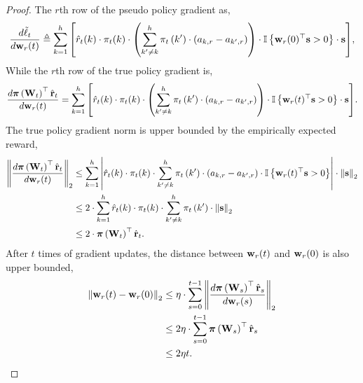 \begin{proof}
The $r$th row of the pseudo policy gradient as,
\begin{equation*}
	\frac{d \tilde{\ell}_t}{d {\mathbf{w}}_r(t)} \triangleq \sum\limits_{k=1}^{h}{ \left[ \hat{r}_{t}(k) \cdot \pi_{t}(k) \cdot \left( \sum\limits_{k^\prime \not= k}^{h}{ \pi_{t}\left(k^\prime\right) \cdot \left( a_{k,r} - a_{k^\prime,r} \right)  } \right) \cdot {\mathbb{I}}\left\{ {\mathbf{w}}_r(0)^\top {\mathbf{s}} > 0 \right\} \cdot {\mathbf{s}} \right] },
\end{equation*}
While the $r$th row of the true policy gradient is,
\begin{equation*}
	\frac{d {\boldsymbol{\pi}}\left( {\mathbf{W}}_t \right)^\top \hat{{\mathbf{r}}}_t}{d {\mathbf{w}}_r(t)} = \sum\limits_{k=1}^{h}{ \left[\hat{r}_{t}(k) \cdot \pi_{t}(k) \cdot \left( \sum\limits_{k^\prime \not= k}^{h}{ \pi_{t}\left(k^\prime\right) \cdot \left( a_{k,r} - a_{k^\prime,r} \right)  } \right) \cdot {\mathbb{I}}\left\{ {\mathbf{w}}_r(t)^\top {\mathbf{s}} > 0 \right\} \cdot {\mathbf{s}} \right] }.
\end{equation*}
The true policy gradient norm is upper bounded by the empirically expected reward,
\begin{equation*}
\begin{split}
	\left\| \frac{d {\boldsymbol{\pi}}\left( {\mathbf{W}}_t \right)^\top \hat{{\mathbf{r}}}_t}{d {\mathbf{w}}_r(t)} \right\|_2 &\le \sum\limits_{k=1}^{h}{ \left|\hat{r}_{t}(k) \cdot \pi_{t}(k) \cdot \sum\limits_{k^\prime \not= k}^{h}{ \pi_{t}\left(k^\prime\right) \cdot \left( a_{k,r} - a_{k^\prime,r} \right)  } \cdot {\mathbb{I}}\left\{ {\mathbf{w}}_r(t)^\top {\mathbf{s}} > 0 \right\} \right| \cdot \left\| {\mathbf{s}} \right\|_2 } \\
	&\le 2 \cdot \sum\limits_{k=1}^{h}{\hat{r}_{t}(k) \cdot \pi_{t}(k) \cdot \sum\limits_{k^\prime \not= k}^{h}{ \pi_{t}\left(k^\prime\right)  } \cdot \left\| {\mathbf{s}} \right\|_2  } \\
	&\le 2 \cdot {\boldsymbol{\pi}}\left({\mathbf{W}}_t\right)^\top \hat{{\mathbf{r}}}_t.
\end{split}
\end{equation*}
After $t$ times of gradient updates, the distance between ${\mathbf{w}}_r(t)$ and ${\mathbf{w}}_r(0)$ is also upper bounded,
\begin{equation*}
\begin{split}
	\left\| \rvw_r(t) - \rvw_r(0) \right\|_2 &\le \eta \cdot \sum\limits_{s=0}^{t-1}{\left\| \frac{d \rvpi\left( \rmW_s \right)^\top \hat{\rvr}_s}{d \rvw_r(s)} \right\|_2} \\
	&\le 2 \eta \cdot \sum\limits_{s=0}^{t-1}{ \rvpi\left(\rmW_s\right)^\top \hat{\rvr}_s } \\
	&\le 2 \eta t .

\end{split}
\end{equation*}
\end{proof}
